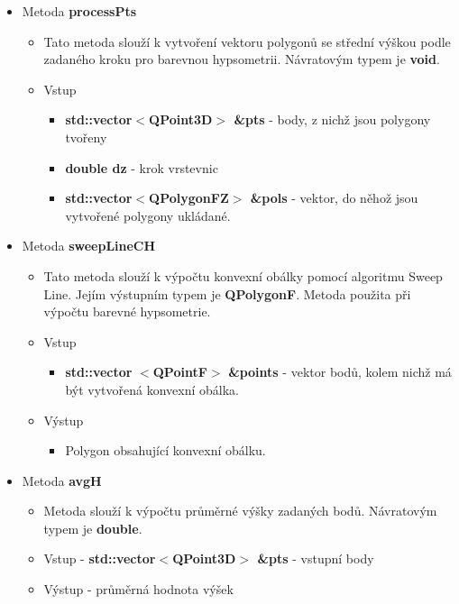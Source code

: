 \documentclass[a4paper, 12pt]{article}
\begin{document}
\begin{itemize}
\item Metoda \textbf{processPts}
\begin{itemize}
	\item Tato metoda slouží k vytvoření vektoru polygonů se střední výškou podle zadaného kroku pro barevnou hypsometrii. Návratovým typem je \textbf{void}.
	\item Vstup
	\begin{itemize}
		\item \textbf{std::vector$<$QPoint3D$>$ \&pts} - body, z nichž jsou polygony tvořeny
		\item \textbf{double dz} - krok vrstevnic
		\item \textbf{std::vector$<$QPolygonFZ$>$ \&pols} - vektor, do něhož jsou vytvořené polygony ukládané.
	\end{itemize}
\end{itemize}

	\item Metoda \textbf{sweepLineCH}
\begin{itemize}
	\item Tato metoda slouží k výpočtu konvexní obálky pomocí algoritmu Sweep Line. Jejím výstupním typem je \textbf{QPolygonF}. Metoda použita při výpočtu barevné hypsometrie.
	\item Vstup
	\begin{itemize}
		\item \textbf{std::vector} $<$\textbf{QPointF}$>$ \textbf{\&points} - vektor bodů, kolem nichž má být vytvořená konvexní obálka.
	\end{itemize}
	\item Výstup
	\begin{itemize}
		\item Polygon obsahující konvexní obálku.
	\end{itemize} 
\end{itemize}

\item Metoda \textbf{avgH}
\begin{itemize}
	\item Metoda slouží k výpočtu průměrné výšky zadaných bodů. Návratovým typem je \textbf{double}.
	\item Vstup - \textbf{std::vector$<$QPoint3D$>$ \&pts} - vstupní body
	\item Výstup - průměrná hodnota výšek
	
\end{itemize}

\end{itemize}	
\end{document}
